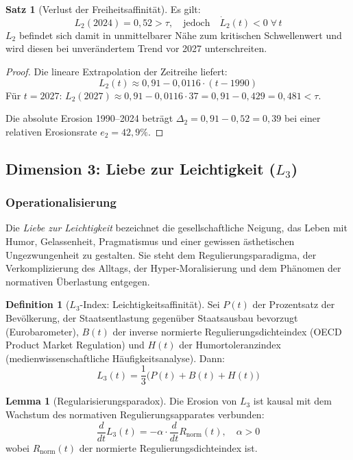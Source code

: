 ﻿\documentclass[a4paper,12pt]{article}
\theoremstyle{definition}
\newtheorem{definition}{Definition}
\newtheorem{satz}{Satz}
\newtheorem{lemma}{Lemma}
\begin{document}
\begin{satz}[Verlust der Freiheitsaffinität]
\label{satz:l2verlust}
Es gilt:
\[
L_2(2024) = 0{,}52 > \tau, \quad \text{jedoch} \quad \dot{L}_2(t) < 0 \;\forall\, t
\]
$L_2$ befindet sich damit in unmittelbarer Nähe zum kritischen Schwellenwert und wird diesen bei unverändertem Trend vor 2027 unterschreiten.
\end{satz}

\begin{proof}
Die lineare Extrapolation der Zeitreihe liefert:
\[
L_2(t) \approx 0{,}91 - 0{,}0116 \cdot (t - 1990)
\]
Für $t = 2027$: $L_2(2027) \approx 0{,}91 - 0{,}0116 \cdot 37 = 0{,}91 - 0{,}429 = 0{,}481 < \tau$.

Die absolute Erosion 1990--2024 beträgt $\Delta_2 = 0{,}91 - 0{,}52 = 0{,}39$ bei einer relativen Erosionsrate $e_2 = 42{,}9\%$. \qedhere
\end{proof}

\subsection{Dimension 3: Liebe zur Leichtigkeit ($L_3$)}

\subsubsection{Operationalisierung}

Die \emph{Liebe zur Leichtigkeit} bezeichnet die gesellschaftliche Neigung, das Leben mit Humor, Gelassenheit, Pragmatismus und einer gewissen ästhetischen Ungezwungenheit zu gestalten. Sie steht dem Regulierungsparadigma, der Verkomplizierung des Alltags, der Hyper-Moralisierung und dem Phänomen der normativen Überlastung entgegen.

\begin{definition}[$L_3$-Index: Leichtigkeitsaffinität]
Sei $P(t)$ der Prozentsatz der Bevölkerung, der Staatsentlastung gegenüber Staatsausbau bevorzugt (Eurobarometer), $B(t)$ der inverse normierte Regulierungsdichteindex (OECD Product Market Regulation) und $H(t)$ der Humortoleranzindex (medienwissenschaftliche Häufigkeitsanalyse). Dann:
\[
L_3(t) = \frac{1}{3}\bigl(P(t) + B(t) + H(t)\bigr)
\]
\end{definition}

\begin{lemma}[Regularisierungsparadox]
\label{lem:regulierung}
Die Erosion von $L_3$ ist kausal mit dem Wachstum des normativen Regulierungsapparates verbunden:
\[
\frac{d}{dt}L_3(t) = -\alpha \cdot \frac{d}{dt}R_{\text{norm}}(t), \quad \alpha > 0
\]
wobei $R_{\text{norm}}(t)$ der normierte Regulierungsdichteindex ist.
\end{lemma}
\end{document}
